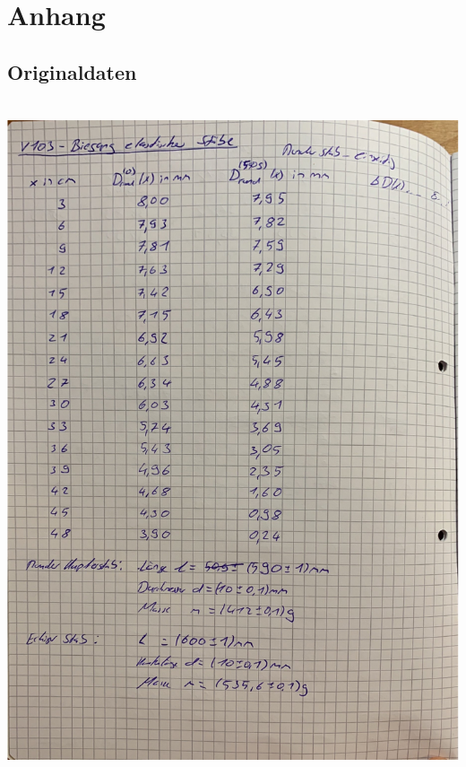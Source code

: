 \section{Anhang}
\label{sec:Anhang}
\subsection{Originaldaten}
\includegraphics[height=20cm]{content/Originaldaten/Originaldaten_1.pdf}
\newpage
